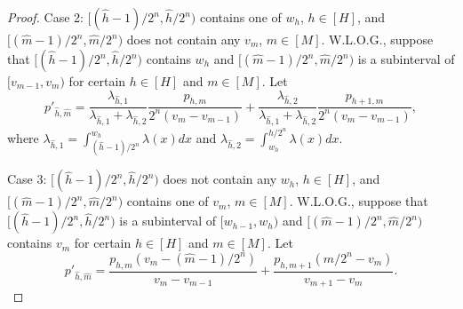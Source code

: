 \documentclass[11pt, reqno]{article}
\numberwithin{equation}{section}
\numberwithin{theorem}{section}
\begin{document}
\begin{proof}
Case 2: $[(\hat{h}-1)/2^n,\hat{h}/2^n)$ contains one of $w_h$, $h\in[H]$, and $[(\hat{m}-1)/2^n,\hat{m}/2^n)$ does not contain any $v_m$, $m\in[M]$. W.L.O.G., suppose that $[(\hat{h}-1)/2^n,\hat{h}/2^n)$ contains $w_h$ and $[(\hat{m}-1)/2^n,\hat{m}/2^n)$ is a subinterval of $[v_{m-1},v_m)$ for certain $h\in[H]$ and $m\in[M]$. Let 
$$p'_{\hat{h},\hat{m}}=\frac{\lambda_{\hat{h},1}}{\lambda_{\hat{h},1}+\lambda_{\hat{h},2}}\frac{p_{h,m}}{2^n(v_m-v_{m-1})}+\frac{\lambda_{\hat{h},2}}{\lambda_{\hat{h},1}+\lambda_{\hat{h},2}}\frac{p_{h+1,m}}{2^n(v_m-v_{m-1})},$$ where $\lambda_{\hat{h},1}=\int_{(\hat{h}-1)/2^n}^{w_h}\lambda(x)dx$ and $\lambda_{\hat{h},2}=\int^{\hat{h}/2^n}_{w_h}\lambda(x)dx$.

Case 3: $[(\hat{h}-1)/2^n,\hat{h}/2^n)$ does not contain any $w_h$, $h\in[H]$, and $[(\hat{m}-1)/2^n,\hat{m}/2^n)$ contains one of $v_m$, $m\in[M]$. W.L.O.G., suppose that $[(\hat{h}-1)/2^n,\hat{h}/2^n)$ is a subinterval of $[w_{h-1},w_h)$ and $[(\hat{m}-1)/2^n,\hat{m}/2^n)$ contains $v_m$ for certain $h\in[H]$ and $m\in[M]$. Let $$p'_{\hat{h},\hat{m}}=\frac{p_{h,m}(v_m-(\hat{m}-1)/2^n)}{v_m-v_{m-1}}+\frac{p_{h,m+1}(\hat{m}/2^n-v_m)}{v_{m+1}-v_m}.$$


\end{proof}
\end{document}

